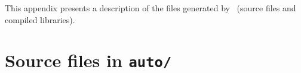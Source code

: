 %
%
%
%
%
%
%

This appendix presents  a description of  the files  generated by \GenoM\
(source files and compiled libraries).

\section{Source files in {\tt auto/}}

